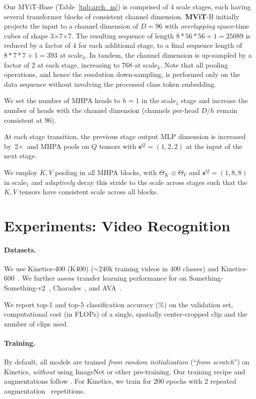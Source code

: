 \documentclass[10pt,twocolumn,letterpaper]{article}
\newcommand{\tblref}[1]{Table~\ref{#1}}
\newcommand{\app}{\raise.17ex\hbox{$\scriptstyle\sim$}}
\def\x{$\times$}
\newcommand{\attnabbv}{MHPA\xspace}
\begin{document}
 Our MViT-Base (\tblref{tab:arch_m}) is comprised of $4$ scale stages, each having several transformer blocks of consistent channel dimension. \textbf{MViT}-B initially projects the input to a channel dimension of $D=96$ with \textit{overlapping} space-time cubes of shape 3\x7\x7. The resulting sequence of length $8 * 56 *56 + 1 = 25089$  is reduced by a factor of $4$ for each additional stage, to a final sequence length of $8 * 7 *7 + 1 = 393$ at scale$_4$. In tandem, the channel dimension is up-sampled by a factor of $2$ at each stage, increasing to $768$ at scale$_4$. Note that all pooling operations, and hence the resolution down-sampling, is performed only on the data sequence without involving the processed class token embedding.

We set the number of \attnabbv heads to $h=1$ in the  scale$_1$ stage and increase the number of heads with the channel dimension (channels per-head  $D/h$ remain consistent at $96$).

At each stage transition, the previous stage output MLP dimension is increased by~2\x~and \attnabbv pools on $Q$ tensors with $\mathbf{s}^Q = (1,2,2)$ at the input of the next stage. 

We employ $K,V$ pooling in all \attnabbv blocks, with $\Theta_K \equiv \Theta_V$ and $\mathbf{s}^Q = (1,8,8)$ in scale$_1$ and \textit{adaptively} decay this stride \wrt to the scale across stages such that the $K,V$ tensors have consistent scale across all blocks.  

\section{Experiments: Video Recognition}

\paragraph{Datasets.} We use Kinetics-400 \cite{Kay2017} (K400) ($\app$240k training videos in 400 classes) and Kinetics-600~\cite{Carreira2017}. We further assess transfer learning performance for on   Something-Something-v2~\cite{ssv2}, Charades~\cite{Sigurdsson2016},  and AVA~\cite{Gu2018}.

We report top-1 and top-5 classification accuracy (\%) on the validation set, 
computational cost (in FLOPs) of a single, spatially center-cropped clip and the number of clips used. 

\paragraph{Training.} By default, all models are trained \emph{from random initialization} (``\emph{from scratch}'') on Kinetics, \emph{without} using ImageNet \cite{Deng2009} or other pre-training. Our training recipe and augmentations follow \cite{Feichtenhofer2019, touvron2020training}. For Kinetics, we train for 200 epochs with 2 repeated augmentation~\cite{hoffer2020augment} repetitions. 
\end{document}
